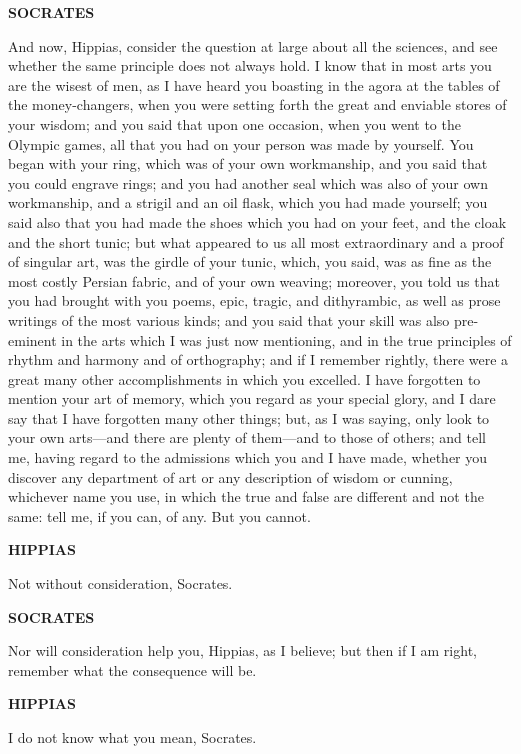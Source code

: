 \documentclass[11pt,letter]{article}
\begin{document}
\par \textbf{SOCRATES}
\par   And now, Hippias, consider the question at large about all the sciences, and see whether the same principle does not always hold. I know that in most arts you are the wisest of men, as I have heard you boasting in the agora at the tables of the money-changers, when you were setting forth the great and enviable stores of your wisdom; and you said that upon one occasion, when you went to the Olympic games, all that you had on your person was made by yourself. You began with your ring, which was of your own workmanship, and you said that you could engrave rings; and you had another seal which was also of your own workmanship, and a strigil and an oil flask, which you had made yourself; you said also that you had made the shoes which you had on your feet, and the cloak and the short tunic; but what appeared to us all most extraordinary and a proof of singular art, was the girdle of your tunic, which, you said, was as fine as the most costly Persian fabric, and of your own weaving; moreover, you told us that you had brought with you poems, epic, tragic, and dithyrambic, as well as prose writings of the most various kinds; and you said that your skill was also pre-eminent in the arts which I was just now mentioning, and in the true principles of rhythm and harmony and of orthography; and if I remember rightly, there were a great many other accomplishments in which you excelled. I have forgotten to mention your art of memory, which you regard as your special glory, and I dare say that I have forgotten many other things; but, as I was saying, only look to your own arts—and there are plenty of them—and to those of others; and tell me, having regard to the admissions which you and I have made, whether you discover any department of art or any description of wisdom or cunning, whichever name you use, in which the true and false are different and not the same:  tell me, if you can, of any. But you cannot.

\par \textbf{HIPPIAS}
\par   Not without consideration, Socrates.

\par \textbf{SOCRATES}
\par   Nor will consideration help you, Hippias, as I believe; but then if I am right, remember what the consequence will be.

\par \textbf{HIPPIAS}
\par   I do not know what you mean, Socrates.
\end{document}
